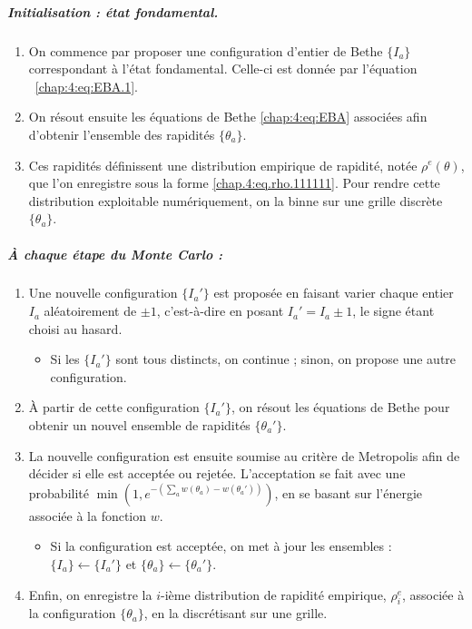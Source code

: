 \medskip

\subparagraph{Initialisation : état fondamental.}
\begin{enumerate}
    \item On commence par proposer une configuration d'entier de Bethe  \( \{I_a\} \) correspondant à l’état fondamental. Celle-ci est donnée par l'équation ~\eqref{chap:4:eq:EBA.1}.

    \item On résout ensuite les équations de Bethe \eqref{chap:4:eq:EBA} associées afin d'obtenir l’ensemble des rapidités \( \{ \theta_a \} \).

	\item Ces rapidités définissent une distribution empirique de rapidité, notée \( \rho^e(\theta) \), que l’on enregistre sous la forme \eqref{chap.4:eq.rho.111111}.
	Pour rendre cette distribution exploitable numériquement, on la binne sur une grille discrète \( \{ \theta_a \} \).
\end{enumerate}

\subparagraph{À chaque étape du Monte Carlo :}
\begin{enumerate}
    \item Une nouvelle configuration \( \{I_a'\} \) est proposée en faisant varier chaque entier \( I_a \) aléatoirement de \(\pm 1\), c’est-à-dire en posant 
		\( I_a' = I_a \pm 1 \), le signe étant choisi au hasard.
    	\begin{itemize}[label = $\bullet$]
        	\item Si les \( \{I_a'\} \) sont tous distincts, on continue ; sinon, on propose une autre configuration.
    	\end{itemize}

    \item À partir de cette configuration \( \{I_a'\} \), on résout les équations de Bethe pour obtenir un nouvel ensemble de rapidités \( \{ \theta_a' \} \).

	\item La nouvelle configuration est ensuite soumise au critère de Metropolis afin de décider si elle est acceptée ou rejetée. L’acceptation se fait avec une probabilité \( \min\left(1 , e^{- \left(\sum_a w(\theta_a) -  w(\theta_a')\right)}\right) \), en se basant sur l’énergie associée à la fonction \( w \).
	\begin{itemize}[label = $\bullet$]
    	\item Si la configuration est acceptée, on met à jour les ensembles : \( \{I_a\} \leftarrow \{I_a'\} \) et \( \{\theta_a\} \leftarrow \{\theta_a'\} \).
	\end{itemize}

	\item Enfin, on enregistre la \(i\)-ième distribution de rapidité empirique, \(\rho^e_i\),  associée à la configuration \(\{\theta_a\}\), en la discrétisant sur une grille.

\end{enumerate}

